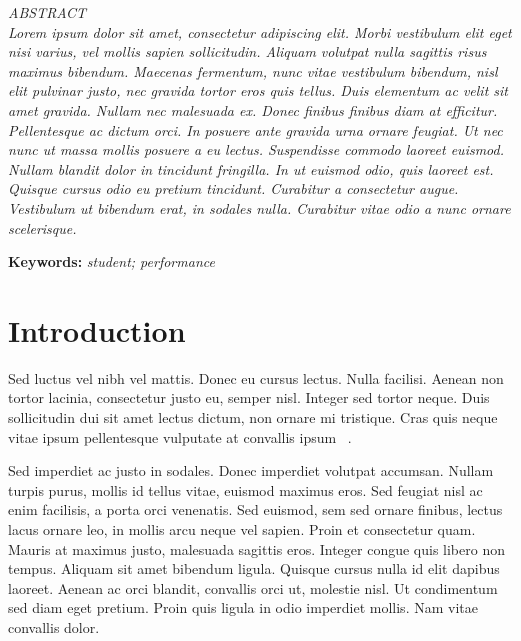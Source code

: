 \documentclass[onecolumn]{article}
\date{}
\makeatletter
\renewenvironment{abstract}
{\trivlist\item[]\leftskip1pt\par\itshape{\centering\itshape ABSTRACT\\\noindent }\ignorespaces}{\endtrivlist\vspace*{-12pt}}
\def\author#1{\gdef\@author{\hskip-\dimexpr(\tabcolsep)\hskip1pt\parbox{\dimexpr\textwidth-1pt}{\fontsize{11}{13}\selectfont\raggedright\centering #1}}}
\def\title#1{\gdef\@title{\fontsize{14}{16}\selectfont\raggedright\centering{\bfseries#1}~\\{\textit{\fontsize{12}{14}\selectfont\malaytitle}}}}
\let\@articletype\@empty
\def\articletype#1{\gdef\@articletype{{\fontsize{13}{15}\selectfont #1}}}
\makeatother
\begin{document}
\def\authorCount{1}
\def\affCount{1}

\def\journalTitle{GEMA Online{\textsuperscript{\textregistered}} Journal of Language Studies}

\title{Success A Habit}\def\malaytitle{}
\def\articletype{}
\author{Mohd Zamri Murah}
\maketitle

\begin{abstract}
Lorem ipsum dolor sit amet, consectetur adipiscing elit. Morbi vestibulum
elit eget nisi varius, vel mollis sapien sollicitudin. Aliquam volutpat
nulla sagittis risus maximus bibendum. Maecenas fermentum, nunc vitae
vestibulum bibendum, nisl elit pulvinar justo, nec gravida tortor eros quis
tellus. Duis elementum ac velit sit amet gravida. Nullam nec malesuada ex.
Donec finibus finibus diam at efficitur. Pellentesque ac dictum orci. In
posuere ante gravida urna ornare feugiat. Ut nec nunc ut massa mollis
posuere a eu lectus. Suspendisse commodo laoreet euismod. Nullam blandit
dolor in tincidunt fringilla. In ut euismod odio, quis laoreet est. Quisque
cursus odio eu pretium tincidunt. Curabitur a consectetur augue. Vestibulum
ut bibendum erat, in sodales nulla. Curabitur vitae odio a nunc ornare
scelerisque.


\end{abstract}

\vspace{1mm}
\smallskip\noindent\textbf{Keywords: }\textit{student; performance}
    
\section*{Introduction}
Sed luctus vel nibh vel mattis. Donec eu cursus lectus. Nulla facilisi.
Aenean non tortor lacinia, consectetur justo eu, semper nisl. Integer sed
tortor neque. Duis sollicitudin dui sit amet lectus dictum, non ornare mi
tristique. Cras quis neque vitae ipsum pellentesque vulputate at convallis
ipsum\unskip~\cite{572698:13220438} .

Sed imperdiet ac justo in sodales. Donec imperdiet volutpat accumsan.
Nullam turpis purus, mollis id tellus vitae, euismod maximus eros. Sed
feugiat nisl ac enim facilisis, a porta orci venenatis. Sed euismod, sem
sed ornare finibus, lectus lacus ornare leo, in mollis arcu neque vel
sapien. Proin et consectetur quam. Mauris at maximus justo, malesuada
sagittis eros. Integer congue quis libero non tempus. Aliquam sit amet
bibendum ligula. Quisque cursus nulla id elit dapibus laoreet. Aenean ac
orci blandit, convallis orci ut, molestie nisl. Ut condimentum sed diam
eget pretium. Proin quis ligula in odio imperdiet mollis. Nam vitae
convallis dolor.
\end{document}
